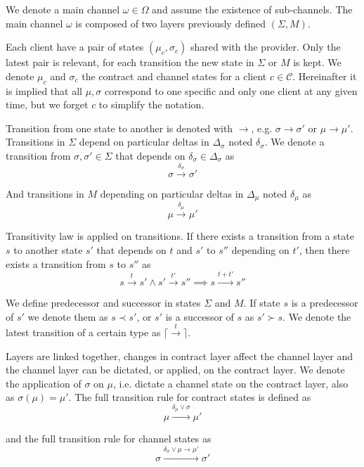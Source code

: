 \documentclass{llncs}
\begin{document}
We denote a main channel $\omega \in \Omega$ and assume the existence of sub-channels. The main channel $\omega$ is composed of two layers previously defined $(\Sigma, M)$.

Each client have a pair of states $(\mu_c, \sigma_c)$ shared with the provider. Only the latest pair is relevant, for each transition the new state in $\Sigma$ or $M$ is kept. We denote $\mu_c$ and $\sigma_c$ the contract and channel states for a client $c \in \mathcal{C}$. Hereinafter it is implied that all $\mu, \sigma$ correspond to one specific and only one client at any given time, but we forget $c$ to simplify the notation.

Transition from one state to another is denoted with $\rightarrow$, e.g. $\sigma \rightarrow \sigma'$ or $\mu \rightarrow \mu'$. Transitions in $\Sigma$ depend on particular deltas in $\Delta_\sigma$ noted $\delta_\sigma$. We denote a transition from $\sigma, \sigma' \in \Sigma$ that depends on $\delta_\sigma \in \Delta_\sigma$ as
$$\sigma \xrightarrow{\delta_\sigma} \sigma'$$

And transitions in $M$ depending on particular deltas in $\Delta_\mu$ noted $\delta_\mu$ as
$$\mu \xrightarrow{\delta_\mu} \mu'$$

Transitivity law is applied on transitions. If there exists a transition from a state $s$ to another state $s'$ that depends on $t$ and $s'$ to $s''$ depending on $t'$, then there exists a transition from $s$ to $s''$ as
$$s \xrightarrow{t} s' \land s' \xrightarrow{t'} s'' \implies s \xrightarrow{t + t'} s''$$

We define predecessor and successor in states $\Sigma$ and $M$. If state $s$ is a predecessor of $s'$ we denote them as $s \prec s'$, or $s'$ is a successor of $s$ as $s' \succ s$. We denote the latest transition of a certain type as $\lceil \xrightarrow{t} \rceil$.

Layers are linked together, changes in contract layer affect the channel layer and the channel layer can be dictated, or applied, on the contract layer. We denote the application of $\sigma$ on $\mu$, i.e. dictate a channel state on the contract layer, also as $\sigma(\mu) = \mu'$. The full transition rule for contract states is defined as
$$\mu \xrightarrow{\delta_\mu \lor \sigma} \mu'$$

and the full transition rule for channel states as
$$\sigma \xrightarrow{\delta_\sigma \lor \mu \rightarrow \mu'} \sigma'$$
\end{document}
